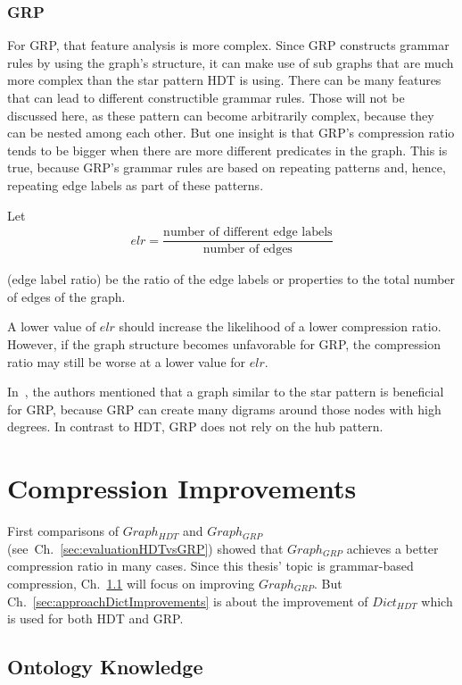 \subsubsection{GRP}
For GRP, that feature analysis is more complex. Since GRP constructs grammar rules by using the graph's structure, it can make use of sub graphs that are much more complex than the star pattern HDT is using. There can be many features that can lead to different constructible grammar rules. Those will not be discussed here, as these pattern can become arbitrarily complex, because they can be nested among each other. But one insight is that GRP's compression ratio tends to be bigger when there are more different predicates in the graph. This is true, because GRP's grammar rules are based on repeating patterns and, hence, repeating edge labels as part of these patterns.

Let 
\begin{align*}
elr = \dfrac{\text{number of different edge labels}}{\text{number of edges}} 
\end{align*}

(edge label ratio) be the ratio of the edge labels or properties to the total number of edges of the graph. 

A lower value of $elr$ should increase the likelihood of a lower compression ratio.  However, if the graph structure becomes unfavorable for GRP, the compression ratio may still be worse at a lower value for $elr$.

In~\cite{maneth}, the authors mentioned that a graph similar to the star pattern is beneficial for GRP, because GRP can create many digrams around those nodes with high degrees. In contrast to HDT, GRP does not rely on the hub pattern.


\section{Compression Improvements}\label{sec:approachComprRatioImprovements}

First comparisons of $Graph_{HDT}$ and $Graph_{GRP}$ (see~Ch.~\ref{sec:evaluationHDTvsGRP}) showed that  $Graph_{GRP}$ achieves a better compression ratio in many cases. Since this thesis' topic is grammar-based compression, Ch.~\ref{sec:approachOntKnowledge} will focus on improving $Graph_{GRP}$. But Ch.~\ref{sec:approachDictImprovements} is about the improvement of $Dict_{HDT}$ which is used for both HDT and GRP.



\subsection{Ontology Knowledge}\label{sec:approachOntKnowledge}


